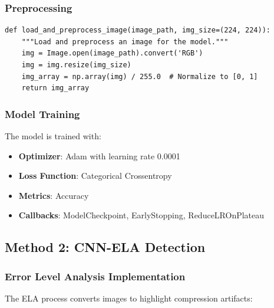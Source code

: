 \documentclass[12pt,a4paper]{article}
\begin{document}
\subsubsection{Preprocessing}
\begin{lstlisting}[caption=Image Preprocessing for AI Detection]
def load_and_preprocess_image(image_path, img_size=(224, 224)):
    """Load and preprocess an image for the model."""
    img = Image.open(image_path).convert('RGB')
    img = img.resize(img_size)
    img_array = np.array(img) / 255.0  # Normalize to [0, 1]
    return img_array
\end{lstlisting}

\subsubsection{Model Training}
The model is trained with:
\begin{itemize}
    \item \textbf{Optimizer}: Adam with learning rate 0.0001
    \item \textbf{Loss Function}: Categorical Crossentropy
    \item \textbf{Metrics}: Accuracy
    \item \textbf{Callbacks}: ModelCheckpoint, EarlyStopping, ReduceLROnPlateau
\end{itemize}

\subsection{Method 2: CNN-ELA Detection}

\subsubsection{Error Level Analysis Implementation}
The ELA process converts images to highlight compression artifacts:
\end{document}
